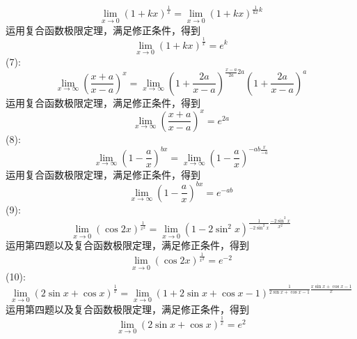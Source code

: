 \documentclass{ctexart}
\begin{document}
\[\lim\limits_{x\rightarrow 0}(1+kx)^{\frac{1}{x}}=\lim\limits_{x\rightarrow 0}(1+kx)^{\frac{1}{kx}k}\]
运用复合函数极限定理，满足修正条件\uppercase\expandafter{}，得到
\[\lim\limits_{x\rightarrow 0}(1+kx)^{\frac{1}{x}}=e^k\]
(7):\\
\[\lim\limits_{x\rightarrow\infty}(\frac{x+a}{x-a})^x=\lim\limits_{x\rightarrow\infty}(1+\frac{2a}{x-a})^{\frac{x-a}{2a}2a}(1+\frac{2a}{x-a})^a\]
运用复合函数极限定理，满足修正条件\uppercase\expandafter{}，得到
\[\lim\limits_{x\rightarrow\infty}(\frac{x+a}{x-a})^x=e^{2a}\]
(8):\\
\[\lim\limits_{x\rightarrow\infty}(1-\frac{a}{x})^{bx}=\lim\limits_{x\rightarrow\infty}(1-\frac{a}{x})^{-ab\frac{x}{-a}}\]
运用复合函数极限定理，满足修正条件\uppercase\expandafter{}，得到
\[\lim\limits_{x\rightarrow\infty}(1-\frac{a}{x})^{bx}=e^{-ab}\]
(9):\\
\[\lim\limits_{x\rightarrow0}(\cos 2x)^{\frac{1}{x^2}}=\lim\limits_{x\rightarrow0}(1-2\sin^2x)^{\frac{1}{-2\sin^2x}\frac{-2\sin^2x}{x^2}}\]
运用第四题以及复合函数极限定理，满足修正条件\uppercase\expandafter{}，得到
\[\lim\limits_{x\rightarrow0}(\cos 2x)^{\frac{1}{x^2}}=e^{-2}\]
(10):\\
\[\lim\limits_{x\rightarrow0}(2\sin x+\cos x)^{\frac{1}{x}}=\lim\limits_{x\rightarrow0}(1+2\sin x+\cos x-1)^{\frac{1}{2\sin x+\cos x-1}\frac{x\sin x+\cos x-1}{x}}\]
运用第四题以及复合函数极限定理，满足修正条件\uppercase\expandafter{}，得到
\[\lim\limits_{x\rightarrow0}(2\sin x+\cos x)^{\frac{1}{x}}=e^2\]
\end{document}
